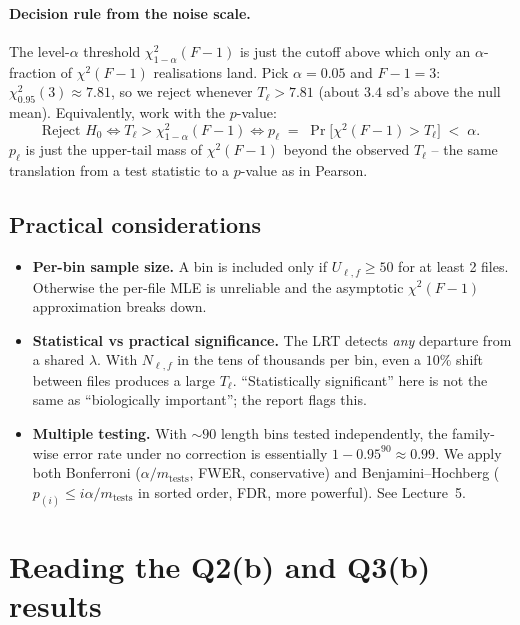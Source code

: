 \documentclass[11pt]{article}
\begin{document}
\paragraph{Decision rule from the noise scale.}
The level-$\alpha$ threshold $\chi^{2}_{1-\alpha}(F-1)$ is just the cutoff
above which only an $\alpha$-fraction of $\chi^{2}(F-1)$ realisations
land. Pick $\alpha = 0.05$ and $F-1 = 3$: $\chi^{2}_{0.95}(3) \approx 7.81$,
so we reject whenever $T_\ell > 7.81$ (about $3.4$ sd's above the null
mean). Equivalently, work with the $p$-value:
\[
   \boxed{\;
     \text{Reject } H_0 \iff T_\ell > \chi^{2}_{1-\alpha}(F-1)
     \iff p_\ell \;=\; \Pr\!\bigl[\chi^{2}(F-1) > T_\ell\bigr] \;<\; \alpha.
   \;}
\]
$p_\ell$ is just the upper-tail mass of $\chi^{2}(F-1)$ beyond the observed
$T_\ell$ -- the same translation from a test statistic to a $p$-value as
in Pearson.

\subsection{Practical considerations}

\begin{itemize}[leftmargin=2em,itemsep=2pt]
\item \textbf{Per-bin sample size.} A bin is included only if
       $U_{\ell,f} \geq 50$ for at least 2 files. Otherwise the per-file
       MLE is unreliable and the asymptotic $\chi^{2}(F-1)$ approximation
       breaks down.
\item \textbf{Statistical vs practical significance.} The LRT detects
       \emph{any} departure from a shared $\lambda$. With $N_{\ell,f}$ in
       the tens of thousands per bin, even a $10\%$ shift between files
       produces a large $T_\ell$. ``Statistically significant'' here is
       not the same as ``biologically important''; the report flags this.
\item \textbf{Multiple testing.} With $\sim 90$ length bins tested
       independently, the family-wise error rate under no correction is
       essentially $1 - 0.95^{90} \approx 0.99$. We apply both Bonferroni
       ($\alpha/m_{\text{tests}}$, FWER, conservative) and
       Benjamini--Hochberg ($p_{(i)} \leq i\alpha/m_{\text{tests}}$ in
       sorted order, FDR, more powerful). See Lecture~5.
\end{itemize}

\section{Reading the Q2(b) and Q3(b) results}
\end{document}
